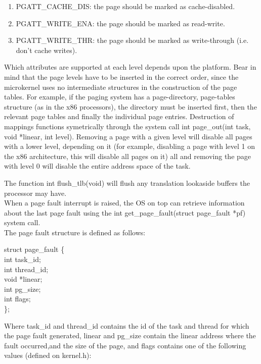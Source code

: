 \documentclass[11pt, letterpaper, twoside, english]{book}
\begin{document}
\begin{enumerate}
\item[] \textsf{PGATT\_CACHE\_DIS}: the page should be marked as cache-disabled.
\item[] \textsf{PGATT\_WRITE\_ENA}: the page should be marked as read-write.
\item[] \textsf{PGATT\_WRITE\_THR}: the page should be marked as write-through (i.e. don't cache writes).
\end{enumerate}

Which attributes are supported at each level depends upon the platform. Bear in mind that the page levels have to be inserted in the correct order, since the microkernel uses no intermediate structures in the construction of the page tables. For example, if the paging system has a page-directory, page-tables structure (as in the x86 processors), the directory must be inserted first, then the relevant page tables and finally the individual page entries. Destruction of mappings functions symetrically through the system call \textsf{int page\_out(int task, void *linear, int level)}. Removing a page with a given level will disable all pages with a lower level, depending on it (for example, disabling a page with level 1 on the x86 architecture, this will disable all pages on it) all and removing the page with level 0 will disable the entire address space of the task.

The function \textsf{int flush\_tlb(void)} will flush any translation lookaside buffers the processor may have.\\

When a page fault interrupt is raised, the OS on top can retrieve information about the last page fault using the \textsf{int get\_page\_fault(struct page\_fault *pf)} system call.\\
The page fault structure is defined as follows:\\

\begin{sf} 
\noindent struct page\_fault \{\\
\indent int task\_id; \\
\indent int thread\_id; \\
\indent void *linear; \\
\indent int pg\_size; \\
\indent int flags; \\
\}; \\
\end{sf}

Where \textsf{task\_id} and \textsf{thread\_id} contains the id of the task and thread for which the page fault generated, \textsf{linear} and \textsf{pg\_size} contain the linear address where the fault occurred,and the size of the page, and \textsf{flags} contains one of the following values (defined on \textsf{kernel.h}):
\end{document}
